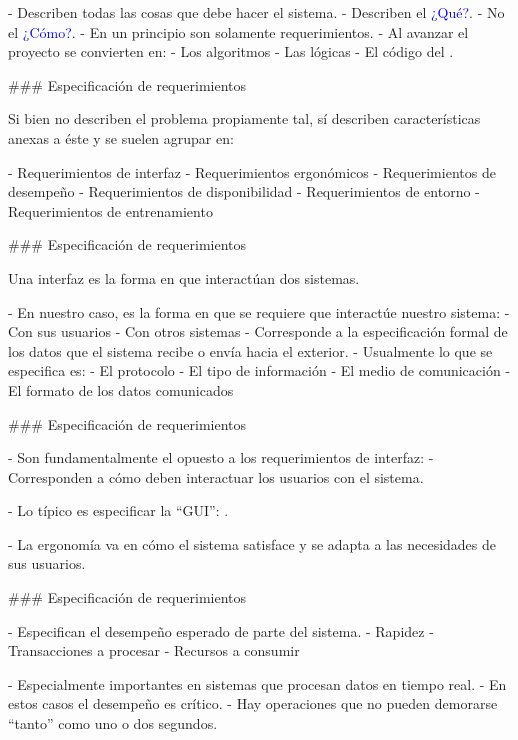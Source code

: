 - Describen todas las cosas que debe hacer el sistema.
    - Describen el \textcolor{blue}{¿Qué?}.
    - No el \textcolor{blue}{¿Cómo?}.
- En un principio son solamente requerimientos.
- Al avanzar el proyecto se convierten en:
    - Los algoritmos
    - Las lógicas
    - El código del .

### Especificación de requerimientos


Si bien no describen el problema propiamente tal, sí describen características anexas a éste y
se suelen agrupar en:

- Requerimientos de interfaz
- Requerimientos ergonómicos
- Requerimientos de desempeño
- Requerimientos de disponibilidad
- Requerimientos de entorno
- Requerimientos de entrenamiento

### Especificación de requerimientos


Una interfaz es la forma en que interactúan dos sistemas.\newline

- En nuestro caso, es la forma en que se requiere que interactúe nuestro sistema:
    - Con sus usuarios
    - Con otros sistemas
- Corresponde a la especificación formal de los datos que el sistema recibe o envía hacia
el exterior.
- Usualmente lo que se especifica es:
    - El protocolo
    - El tipo de información
    - El medio de comunicación
    - El formato de los datos comunicados

### Especificación de requerimientos


- Son fundamentalmente el opuesto a los requerimientos de interfaz:
    - Corresponden a cómo deben interactuar los usuarios con el sistema.

- Lo típico es especificar la ``GUI'': .

- La ergonomía va en cómo el sistema satisface y se adapta a las necesidades
de sus usuarios.

### Especificación de requerimientos


- Especifican el desempeño esperado de parte del sistema.
    - Rapidez
    - Transacciones a procesar
    - Recursos a consumir

- Especialmente importantes en sistemas que procesan datos en tiempo real.
    - En estos casos el desempeño es crítico.
    - Hay operaciones que no pueden demorarse ``tanto'' como uno o dos segundos.

